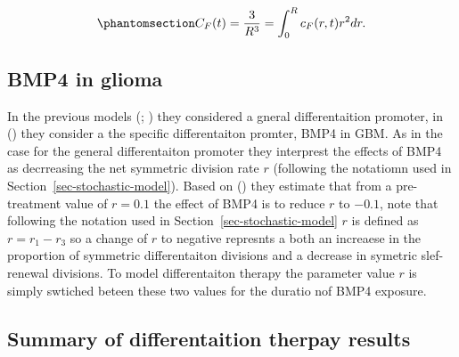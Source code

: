 \documentclass[
  letterpaper,
]{scrreprt}
\theoremstyle{definition}
\theoremstyle{remark}
\begin{document}
\begin{equation}\phantomsection\label{eq-bachman-CF2}{
C_F(t) = \frac{3}{R^3} = \int^R_0 c_F (r,t) r^2 dr.
}\end{equation}

\subsection{BMP4 in glioma}\label{bmp4-in-glioma}

In the previous models (; ) they considered a gneral differentaition promoter, in
() they consider a the
specific differentaiton promter, BMP4 in GBM. As in the case for the
general differentaiton promoter they interprest the effects of BMP4 as
decrreasing the net symmetric division rate \(r\) (following the
notatiomn used in Section~\ref{sec-stochastic-model}). Based on
() they estimate
that from a pre-treatment value of \(r = 0.1\) the effect of BMP4 is to
reduce \(r\) to \(-0.1\), note that following the notation used in
Section~\ref{sec-stochastic-model} \(r\) is defined as \(r = r_1-r_3\)
so a change of \(r\) to negative represnts a both an increaese in the
proportion of symmetric differentaiton divisions and a decrease in
symetric slef-renewal divisions. To model differentaiton therapy the
parameter value \(r\) is simply swtiched beteen these two values for the
duratio nof BMP4 exposure.

\subsection{Summary of differentaition therpay
results}\label{summary-of-differentaition-therpay-results}
\end{document}
